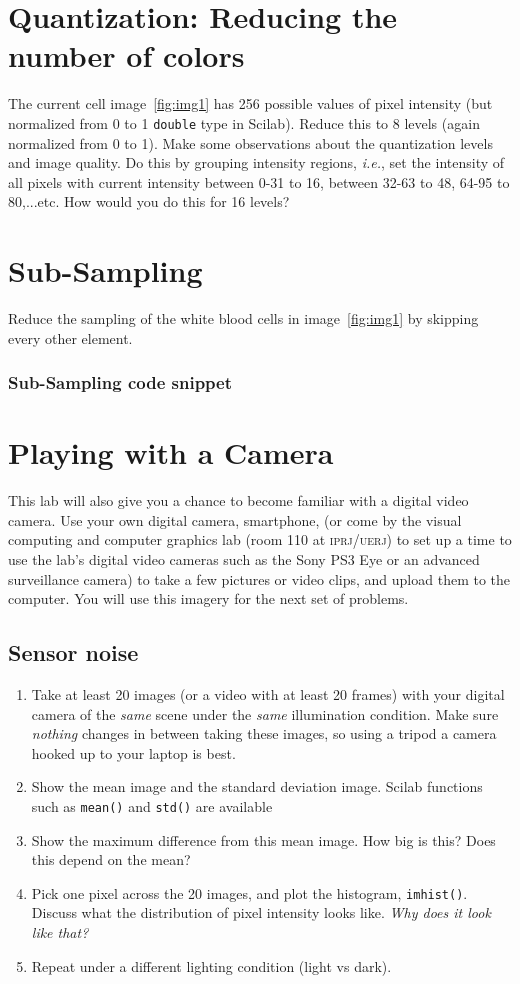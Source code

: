 \documentclass[a4paper]{article}
\newcommand{\code}[2]{
 \vspace{1em}
 \subsubsection*{#1}
 
}
\newcommand{\ie}{{\it i.e.}}
\begin{document}
\section{Quantization: Reducing the number of colors}
The current cell image~\ref{fig:img1} has 256 possible values of pixel
intensity (but normalized from 0 to 1 \texttt{double} type in Scilab). 
Reduce
this to 8 levels (again normalized from 0 to 1). Make some observations about the quantization levels and image
quality. Do this by grouping intensity regions, \ie, set the intensity of all
pixels with current intensity between 0-31 to 16, between 32-63 to 48, 64-95 to
80,...etc.  How would you do this for 16 levels?

\section{Sub-Sampling}
Reduce the sampling of the white blood cells in image~\ref{fig:img1} by skipping
every other element.
\code{Sub-Sampling  code snippet}{sampling-code.sci}

\section{Playing with a Camera}

This lab will also give you a chance to become familiar with a digital video camera.
Use your own digital camera, smartphone, (or come by the visual computing and
computer graphics lab (room 110 at
\textsc{iprj/uerj}) to set up
a time to use the lab's digital video cameras such as the Sony PS3 Eye or 
an advanced surveillance camera) to take a few pictures or video clips, and upload them
to the computer. You will use this imagery for the next set of problems.

\subsection{Sensor noise}

\begin{enumerate}
\item Take at least 20 images (or a video with at least 20 frames) with your digital camera 
of the \textit{same} scene under the \textit{same}
illumination condition. Make sure \emph{nothing} changes in between taking these
images, so using a tripod a camera hooked up to your laptop is best.
\item Show the mean image and the standard deviation image. Scilab functions 
such as \texttt{mean()} and \texttt{std()} are available
\item Show the maximum difference from this mean image. How big is this? Does this depend
on the mean?
\item Pick one pixel across the 20 images, and plot the histogram,
\texttt{imhist()}. Discuss what the distribution of pixel intensity looks like.  \emph{Why does it
look like that?}
\item Repeat under a different lighting condition (light vs dark).
\end{enumerate}



\end{document}
